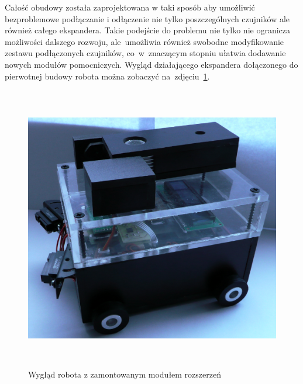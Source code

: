 Całość obudowy została zaprojektowana w taki sposób
aby umożliwić bezproblemowe podłączanie i odłączenie nie tylko poszczególnych
czujników ale również całego ekspandera. Takie podejście do problemu nie
tylko nie ogranicza możliwości dalszego rozwoju, ale~umożliwia również swobodne
modyfikowanie zestawu podłączonych czujników, co~w~znaczącym stopniu
ułatwia dodawanie nowych modułów pomocniczych. Wygląd działającego ekspandera
dołączonego do pierwotnej budowy robota można zobaczyć na~zdjęciu~\ref{fig:DE2SideVIew}. 

\begin{figure}[h!]
 \centering
 \includegraphics[height=125mm]{../images/ch04/de2_side_view.png}
 \caption{Wygląd robota z zamontowanym modułem rozszerzeń}
 \label{fig:DE2SideVIew}
\end{figure}